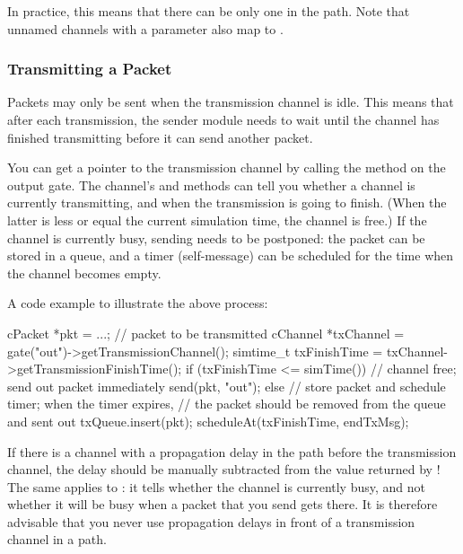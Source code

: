 \begin{note}
  In practice, this means that there can be only one 
  in the path. Note that unnamed channels with a  parameter
  also map to .
\end{note}


\subsubsection{Transmitting a Packet}
\label{sec:simple-modules:transmitting-a-packet}

Packets may only be sent when the transmission channel is idle.
This means that after each transmission, the sender module needs
to wait until the channel has finished transmitting before it can
send another packet.

You can get a pointer to the transmission channel by calling the
 method on the output gate.
The channel's  and 
methods can tell you whether a channel is currently transmitting,
and when the transmission is going to finish. (When the latter is
less or equal the current simulation time, the channel is free.)
If the channel is currently busy, sending needs to be postponed:
the packet can be stored in a queue, and a timer (self-message) can be
scheduled for the time when the channel becomes empty.

A code example to illustrate the above process:

\begin{cpp}
cPacket *pkt = ...; // packet to be transmitted
cChannel *txChannel = gate("out")->getTransmissionChannel();
simtime_t txFinishTime = txChannel->getTransmissionFinishTime();
if (txFinishTime <= simTime()) {
    // channel free; send out packet immediately
    send(pkt, "out");
}
else {
    // store packet and schedule timer; when the timer expires,
    // the packet should be removed from the queue and sent out
    txQueue.insert(pkt);
    scheduleAt(txFinishTime, endTxMsg);
}
\end{cpp}

\begin{note}
  If there is a channel with a propagation delay in
  the path before the transmission channel, the delay should be manually
  subtracted from the value returned by !
  The same applies to : it tells whether the channel is
  currently busy, and not whether it will be busy when a packet that you send
  gets there. It is therefore advisable that you never use propagation delays
  in front of a transmission channel in a path.
\end{note}


